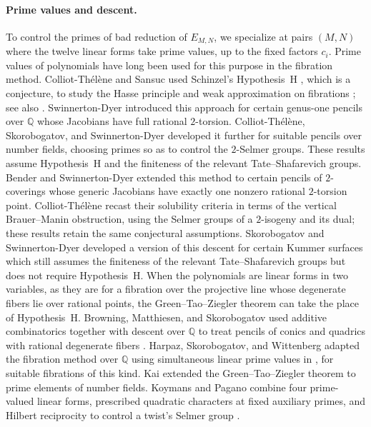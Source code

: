 \documentclass[12pt,oneside,openany]{book}
\theoremstyle{definition}
\theoremstyle{plain}
\numberwithin{equation}{chapter}
\theoremstyle{plain}
\theoremstyle{definition}
\theoremstyle{remark}
\newcommand{\Q}{\mathbb Q}
\begin{document}
\paragraph{Prime values and descent.} To control the primes of bad reduction of $E_{M,N}$, we specialize at pairs $(M,N)$ where the twelve linear forms take prime values, up to the fixed factors $c_i$. Prime values of polynomials have long been used for this purpose in the fibration method. Colliot-Th\'el\`ene and Sansuc used Schinzel's Hypothesis~H \cite{SchinzelSierpinski1958}, which is a conjecture, to study the Hasse principle and weak approximation on fibrations \cite{ColliotTheleneSansuc1982}; see also \cite{ColliotTheleneSwinnertonDyer1994}. Swinnerton-Dyer \cite{SwinnertonDyer1995} introduced this approach for certain genus-one pencils over $\Q$ whose Jacobians have full rational $2$-torsion. Colliot-Th\'el\`ene, Skorobogatov, and Swinnerton-Dyer \cite[Introduction]{CSS1998GenusOne} developed it further for suitable pencils over number fields, choosing primes so as to control the $2$-Selmer groups. These results assume Hypothesis~H and the finiteness of the relevant Tate--Shafarevich groups. Bender and Swinnerton-Dyer \cite[Theorems~1--2]{BenderSwinnertonDyer2001} extended this method to certain pencils of $2$-coverings whose generic Jacobians have exactly one nonzero rational $2$-torsion point. Colliot-Th\'el\`ene \cite[Theorems~A--B and \S1.4]{ColliotThelene2001} recast their solubility criteria in terms of the vertical Brauer--Manin obstruction, using the Selmer groups of a $2$-isogeny and its dual; these results retain the same conjectural assumptions. Skorobogatov and Swinnerton-Dyer \cite{SkorobogatovSwinnertonDyer2005} developed a version of this descent for certain Kummer surfaces which still assumes the finiteness of the relevant Tate--Shafarevich groups but does not require Hypothesis~H. When the polynomials are linear forms in two variables, as they are for a fibration over the projective line whose degenerate fibers lie over rational points, the Green--Tao--Ziegler theorem can take the place of Hypothesis~H. Browning, Matthiesen, and Skorobogatov used additive combinatorics together with descent over $\Q$ to treat pencils of conics and quadrics with rational degenerate fibers \cite[Theorems~1.1--1.2]{BrowningMatthiesenSkorobogatov2014}. Harpaz, Skorobogatov, and Wittenberg adapted the fibration method over $\Q$ using simultaneous linear prime values in \cite{HSW2014}, for suitable fibrations of this kind. Kai \cite{Kai} extended the Green--Tao--Ziegler theorem to prime elements of number fields. Koymans and Pagano combine four prime-valued linear forms, prescribed quadratic characters at fixed auxiliary primes, and Hilbert reciprocity to control a twist's Selmer group \cite[\S3, Theorems~3.3 and~3.5]{KoymansPagano2025}.
\end{document}
